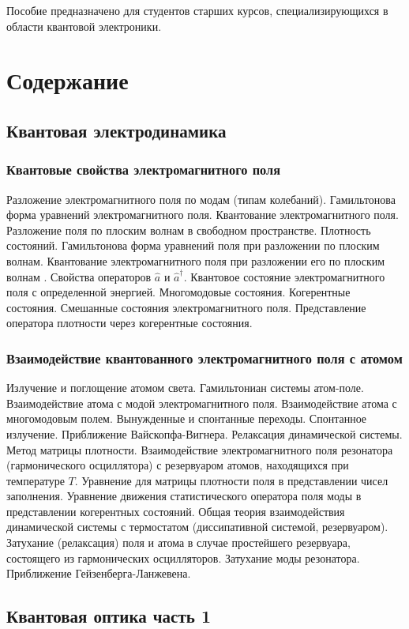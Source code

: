 Пособие предназначено для студентов старших курсов, специализирующихся
в области квантовой электроники. 

\section{Содержание}
\subsection{Квантовая электродинамика}
\subsubsection{Квантовые свойства электромагнитного поля}
Разложение электромагнитного поля по модам (типам колебаний).
Гамильтонова форма уравнений электромагнитного поля.
Квантование электромагнитного поля.
Разложение поля по плоским волнам в свободном пространстве.
Плотность состояний.
Гамильтонова форма уравнений поля при разложении по плоским
волнам.
Квантование электромагнитного поля при разложении его по
плоским волнам .
Свойства операторов $ \hat a $ и $ \hat a ^\dag $.
Квантовое состояние электромагнитного поля  с определенной
  энергией.
Многомодовые состояния. 
Когерентные состояния.
Смешанные состояния электромагнитного поля.
Представление оператора плотности через когерентные
состояния.
\subsubsection{Взаимодействие квантованного электромагнитного поля с атомом}
Излучение и поглощение атомом света.
Гамильтониан системы атом-поле.
Взаимодействие атома с модой электромагнитного поля.
Взаимодействие атома с многомодовым полем. Вынужденные и
спонтанные переходы.
Спонтанное излучение. Приближение Вайскопфа-Вигнера.
Релаксация динамической системы. Метод матрицы плотности.
Взаимодействие электромагнитного поля резонатора
(гармонического осциллятора) с резервуаром атомов, находящихся при
температуре $T$.
Уравнение для матрицы плотности поля в представлении чисел
заполнения.
Уравнение движения статистического оператора поля моды в
представлении когерентных состояний.
Общая теория взаимодействия динамической системы с
термостатом (диссипативной системой, резервуаром).
Затухание (релаксация) поля и атома в случае простейшего
резервуара, состоящего из гармонических осцилляторов.
Затухание моды резонатора. Приближение Гейзенберга-Ланжевена.

\subsection{Квантовая оптика часть 1}
